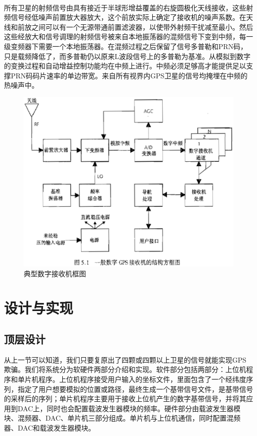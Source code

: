 \documentclass[UTF8,titlepage]{ctexart}
\begin{document}
\paragraph*{}所有卫星的射频信号由具有接近于半球形增益覆盖的右旋圆极化天线接收，这些射频信号经低噪声前置放大器放大，这个前放实际上确定了接收机的噪声系数。在天线和前放之间可以有一个无源带通前置滤波器，以使带外射频干扰减至最小。然后这些经放大和信号调理的射频信号被来自本地振荡器的混频信号下变到中频，每一级变频器下需要一个本地振荡器。在混频过程之后保留了信号多普勒和PRN码，只是载频降低了，而多普勒仍以原来L波段信号上的多普勒为基准。从模拟到数字的变换过程和自动增益控制功能均在中频上进行。中频必须足够高才能提供足以支撑PRN码码片速率的单边带宽。来自所有视界内GPS卫星的信号均掩埋在中频的热噪声中。
\begin{figure}[H]
\centering
\includegraphics[width = .9\textwidth]{digArch.eps}
\caption{典型数字接收机框图}
\label{fig:digArch}
\end{figure}
\section*{设计与实现}
\subsection*{顶层设计}
从上一节可以知道，我们只要复原出了四颗或四颗以上卫星的信号就能实现GPS欺骗。我们将系统分为软硬件两部分介绍和实现。软件部分包括两部分：上位机程序和单片机程序。上位机程序接受用户输入的坐标文件，里面包含了一个经纬度序列，指定了用户想要模拟的位置或路径，最终生成一个基带信号文件，是基带信号的采样后的序列；单片机程序主要用于接收上位机产生的数字基带信号，并将其应用到DAC上，同时也会配置载波发生器模块的频率。硬件部分由载波发生器模块、混频器、DAC、单片机三部分组成。单片机与上位机通信，同时配置混频器、DAC和载波发生器模块。
\end{document}

